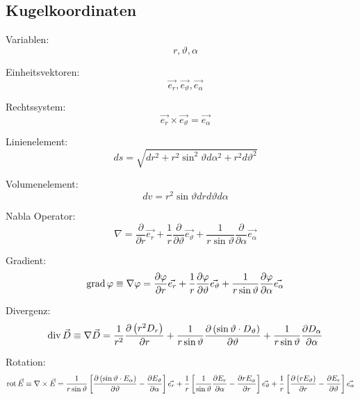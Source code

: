 \subsection{Kugelkoordinaten}
\begin{description}
    \item Variablen:
          \[
              \quad r, \vartheta, \alpha
          \]
    \item Einheitsvektoren:
          \[
              \quad \vec{e_{r}}, \vec{e_{\vartheta}}, \vec{e_{\alpha}}
          \]
    \item Rechtssystem:
          \[
              \quad \vec{e_{r}} \times \vec{e_{\vartheta}}=\vec{e_{\alpha}}
          \]
    \item Linienelement:
          \[
              \quad d s=\sqrt{d r^{2}+r^{2} \sin ^{2} \vartheta d \alpha^{2}+r^{2} d \vartheta^{2}}
          \]
    \item Volumenelement:
          \[
              \quad d v=r^{2} \sin \vartheta d r d \vartheta d \alpha
          \]
    \item Nabla Operator:
          \[
              \quad \nabla=\frac{\partial}{\partial r} \vec{e_{r}}+\frac{1}{r} \frac{\partial}{\partial \vartheta} \vec{e_{\vartheta}}+\frac{1}{r \sin \vartheta} \frac{\partial}{\partial \alpha} \vec{e_{\alpha}}
          \]
    \item Gradient:
          \[
              \quad \operatorname{grad} \varphi \equiv \nabla \varphi=\frac{\partial \varphi}{\partial r} \vec{e_{r}}+\frac{1}{r} \frac{\partial \varphi}{\partial \vartheta} \vec{e_{\vartheta}}+\frac{1}{r \sin \vartheta} \frac{\partial \varphi}{\partial \alpha} \vec{e_{\alpha}}
          \]
    \item Divergenz:
          \[
              \quad \operatorname{div} \vec{D} \equiv \nabla \vec{D}=\frac{1}{r^{2}} \frac{\partial\left(r^{2} D_{r}\right)}{\partial r}+\frac{1}{r \sin \vartheta} \frac{\partial\left(\sin \vartheta \cdot D_{\vartheta}\right)}{\partial \vartheta}+\frac{1}{r \sin \vartheta} \frac{\partial D_{\alpha}}{\partial \alpha}
          \]
    \item Rotation:
          \[
              \operatorname{rot} \vec{E}  \equiv \nabla \times \vec{E}= \frac{1}{r \sin \vartheta}\left[\frac{\partial\left(\sin \vartheta \cdot E_{\alpha}\right)}{\partial \vartheta}-\frac{\partial E_{\vartheta}}{\partial \alpha}\right] \vec{e_{r}}                                                                                 \\
              +                           \frac{1}{r}\left[\frac{1}{\sin \vartheta} \frac{\partial E_{r}}{\partial \alpha}-\frac{\partial r E_{\alpha}}{\partial r}\right] \vec{e_{\vartheta}}+\frac{1}{r}\left[\frac{\partial\left(r E_{\vartheta}\right)}{\partial r}-\frac{\partial E_{r}}{\partial \vartheta}\right] \vec{e_{\alpha}}
\]
\end{description}
